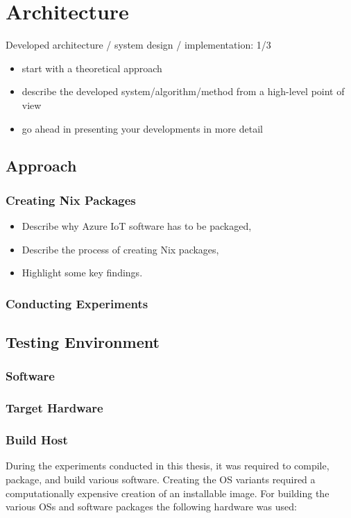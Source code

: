 \chapter{Architecture}
\begin{tcolorbox}[title=TODO]
Developed architecture / system design / implementation: 1/3

\begin{itemize}
\item start with a theoretical approach
\item describe the developed system/algorithm/method from a high-level point of view
\item go ahead in presenting your developments in more detail
\end{itemize}
\end{tcolorbox}

\section{Approach}
\subsection{Creating Nix Packages}
\begin{tcolorbox}[title=TODO]
\begin{itemize}
    \item Describe why Azure IoT software has to be packaged,
    \item Describe the process of creating Nix packages,
    \item Highlight some key findings.
\end{itemize}
\end{tcolorbox}

\subsection{Conducting Experiments}
\section{Testing Environment}
\subsection{Software}
\subsection{Target Hardware}
\subsection{Build Host}
During the experiments conducted in this thesis, it was required to compile,
package, and build various software. Creating the \ac{OS} variants required a
computationally expensive
creation of an installable image. For building the
various \ac{OS}s and software packages the following hardware was used:

